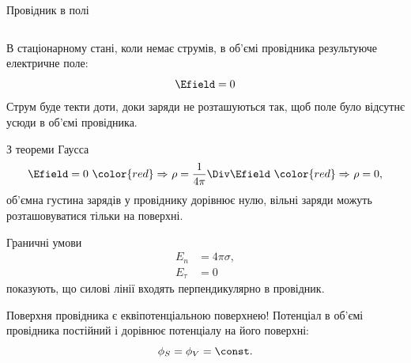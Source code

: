 \documentclass{beamer}
\begin{document}
\begin{frame}{Провідник в полі}{}
\begin{columns}
\begin{column}{0.4\linewidth}
\begin{overprint}
\begin{center}
				\end{center}
			\end{overprint}
		\end{column}
	\end{columns}
	\begin{overprint}
		\begin{block}{}\justifying
			\alert{В стаціонарному стані}, коли немає струмів, в \alert{об'ємі
				провідника результуюче електричне поле}:
			\begin{equation*}
				\Efield = 0
			\end{equation*}
			Струм буде текти доти, доки заряди не розташуються так, щоб поле було
			відсутнє усюди в об'ємі провідника.
		\end{block}
		\begin{block}{}\justifying
			З теореми Гаусса
			\begin{equation*}
				\Efield = 0\ {\color{red}\Rightarrow}\ \rho = \frac1{4\pi} \Div\Efield\
				{\color{red}\Rightarrow}\ \rho = 0,
			\end{equation*}
			об'ємна густина зарядів у провіднику дорівнює нулю, \alert{вільні заряди можуть
				розташовуватися тільки на поверхні}.
		\end{block}
		\begin{block}{}
			Граничні умови
			\begin{align*}
				E_n      & = 4\pi\sigma, \\
				E_{\tau} & = 0
			\end{align*}
			показують, що \alert{силові лінії входять перпендикулярно в провідник}.
		\end{block}
        \begin{alertblock}{}
            Поверхня провідника є еквіпотенціальною поверхнею! Потенціал в об'ємі провідника
            постійний і дорівнює потенціалу на його поверхні:
            \begin{equation*}
                \phi_S = \phi_V = \const.
            \end{equation*}
        \end{alertblock}
	\end{overprint}
\end{frame}
\end{document}
